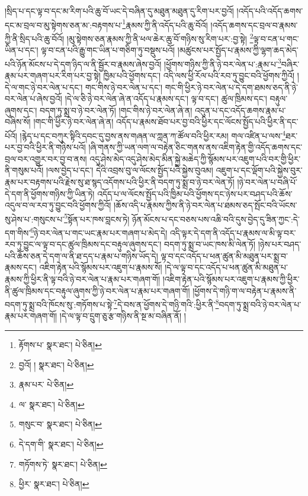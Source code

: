 །སྲིད་པ་དང་ལྟ་བ་དང་མ་རིག་པའི་ཆུ་བོ་ཡང་དེ་བཞིན་དུ་མཐུན་མཐུན་དུ་རིག་པར་བྱའོ། །འདོད་པའི་འདོད་ཆགས་དང་མ་བྲལ་བ་མུ་སྟེགས་ཅན་མ་:བརྟགས་པ་\footnote{རྟོགས་པ་  སྣར་ཐང་།  པེ་ཅིན། }རྣམས་ཀྱི་ནི་འདོད་པའི་ཆུ་བོའོ། །འདོད་ཆགས་དང་བྲལ་བ་རྣམས་ཀྱི་ནི་སྲིད་པའི་ཆུ་བོའོ། །མུ་སྟེགས་ཅན་རྣམས་ཀྱི་ནི་ཕལ་ཆེར་ཆུ་བོ་གཉིས་སུ་རིག་པར་:བྱ་སྟེ། \footnote{བྱའོ། །   སྣར་ཐང་།  པེ་ཅིན། }ལྟ་བ་ངན་པ་གང་ཡིན་པ་དང་། ལྟ་བ་ངན་པའི་རྒྱུ་གང་ཡིན་པ་གཅིག་ཏུ་བསྡུས་པའོ། །མཚུངས་པར་སྤྱོད་པ་རྣམས་ཀྱི་ལྷག་ཆད་མེད་པའི་ཉོན་མོངས་པ་དེ་དག་ཉིད་ལ་ནི་སྦྱོར་བ་རྣམས་ཞེས་བྱའོ། །ཕྱོགས་གཉིས་ཀྱི་ནི་ཉེ་བར་ལེན་པ་:རྣམ་པ་\footnote{རྣམ་པར་  པེ་ཅིན། }བཞིར་རྣམ་པར་གཞག་པར་རིག་པར་བྱ་སྟེ། ཁྱིམ་པའི་ཕྱོགས་དང་། འདི་ལས་ཕྱི་རོལ་པའི་རབ་ཏུ་བྱུང་བའི་ཕྱོགས་ཀྱིའོ། །དེ་ལ་གང་ཉེ་བར་ལེན་པ་དང་། གང་གིས་ཉེ་བར་ལེན་པ་དང་། གང་གི་ཕྱིར་ཉེ་བར་ལེན་པ་དེ་དག་ཐམས་ཅད་ནི་ཉེ་བར་ལེན་པ་ཞེས་བྱའོ། །དེ་ལ་ཅི་ཉེ་བར་ལེན་ཞེ་ན་འདོད་པ་རྣམས་དང་། ལྟ་བ་དང་། ཚུལ་ཁྲིམས་དང་། བརྟུལ་ཞུགས་དང་། བདག་ཏུ་སྨྲ་བ་ཉེ་བར་ལེན་ཏོ། །གང་གིས་ཉེ་བར་ལེན་ཞེ་ན། འདུན་པ་དང་འདོད་ཆགས་རྣམ་པ་བཞིས་སོ། །གང་གི་ཕྱིར་ཉེ་བར་ལེན་ཞེ་ན། འདོད་པ་རྣམས་ཐོབ་པར་བྱ་བའི་ཕྱིར་དང་ལོངས་སྤྱོད་པའི་ཕྱིར་ནི་དང་པོའོ། །རྙེད་པ་དང་བཀུར་སྟིའི་དབང་དུ་བྱས་ནས་གཞན་ལ་ཀླན་ཀ་ཚོལ་བའི་ཕྱིར་རམ། གལ་འཛིན་པ་ལས་\footnote{ལ་  སྣར་ཐང་།  པེ་ཅིན། }ཐར་པར་བྱ་བའི་ཕྱིར་ནི་གཉིས་པའོ། །ཞི་གནས་ཀྱི་ཡན་ལག་ལ་བརྟེན་ཅིང་གནས་ནས་འཇིག་རྟེན་གྱི་འདོད་ཆགས་དང་བྲལ་བར་འགྱུར་བར་བྱ་བ་ནས། འདུ་ཤེས་མེད་འདུ་ཤེས་མེད་མིན་སྐྱེ་མཆེད་ཀྱི་སྙོམས་པར་འཇུག་པའི་བར་གྱི་ཕྱིར་ནི་གསུམ་པའོ། །ལས་བྱེད་པ་དང་། དེའི་འབྲས་བུ་ལ་ལོངས་སྤྱོད་པའི་སྐྱེས་བུའམ། འཇུག་པ་དང་ལྡོག་པའི་སྐྱེས་བུར་རྣམ་པར་བརྟགས་པའི་རྗེས་སུ་ཐ་སྙད་འདོགས་པའི་ཕྱིར་ནི་བདག་ཏུ་སྨྲ་བ་ཉེ་བར་ལེན་ཏོ། །ཉེ་བར་ལེན་པ་བཞི་པོ་དེ་དག་ནི་ཕྱོགས་གཉིས་ཀྱི་ཡིན་ཏེ། འདོད་པ་ལ་ལོངས་སྤྱོད་པའི་ཁྱིམ་པའི་ཕྱོགས་དང་ཉེས་པར་བཤད་པའི་ཆོས་འདུལ་བ་ལ་རབ་ཏུ་བྱུང་བའི་ཕྱོགས་ཀྱིའོ། །ཆོས་འདི་པ་རྣམས་ཀྱིས་ནི་ཉེ་བར་ལེན་པ་ཐམས་ཅད་སྤོང་བའི་ཡོངས་སུ་ཤེས་པ་:གསུངས་པ་\footnote{གསུང་བ་  སྣར་ཐང་།  པེ་ཅིན། }སྟོན་པར་ཁས་བླངས་ཏེ། ཉོན་མོངས་པ་དང་བཅས་པས་འཆི་བའི་དུས་བྱེད་དུ་ཟིན་ཀྱང་:དེ་དག་གིས་\footnote{དེ་དག་གི་  སྣར་ཐང་།  པེ་ཅིན། }ཉེ་བར་ལེན་པ་གང་ཡང་རྣམ་པར་གཞག་པ་མེད་དེ། འདི་ལྟར་དེ་དག་ནི་འདོད་པ་རྣམས་ལ་མི་ལྟ་བར་རབ་ཏུ་བྱུང་ལ་ལྟ་བ་དང་ཚུལ་ཁྲིམས་དང་བརྟུལ་ཞུགས་དང་། བདག་ཏུ་སྨྲ་བ་ཡང་ཁས་མི་ལེན་ཏོ། །ཉེས་པར་བཤད་པའི་ཆོས་ཅན་དེ་དག་ལ་ནི་ཐ་དད་པ་རྣམ་པ་གཉིས་ཡོད་དེ། ལྟ་བ་དང་འདོད་པ་ཕན་ཚུན་མི་མཐུན་པར་སྨྲ་བ་རྣམས་དང་། འཇིག་རྟེན་པའི་སྙོམས་པར་འཇུག་པ་རྣམས་སོ། །དེ་ལ་ལྟ་བ་དང་འདོད་པ་ཕན་ཚུན་མི་མཐུན་པ་རྣམས་ཀྱི་ཕྱིར་ནི་ལྟ་བའི་ཉེ་བར་ལེན་པ་རྣམ་པར་གཞག་གོ། །འཇིག་རྟེན་པའི་སྙོམས་པར་འཇུག་པ་རྣམས་ཀྱི་ཕྱིར་ནི་ཚུལ་ཁྲིམས་དང་བརྟུལ་ཞུགས་ཀྱི་ཉེ་བར་ལེན་པ་རྣམ་པར་གཞག་གོ། །ཕྱོགས་དེ་གཉི་ག་ལ་བརྟེན་པ་རྣམས་ནི་བདག་ཏུ་སྨྲ་བའི་ཁོངས་སུ་:གཏོགས་པ་སྟེ་\footnote{གཏོགས་ཏེ་  སྣར་ཐང་།  པེ་ཅིན། }དེ་བས་ན་ཕྱོགས་དེ་གཉི་གའི་:ཕྱིར་ནི་\footnote{ཕྱིར་  སྣར་ཐང་།  པེ་ཅིན། }བདག་ཏུ་སྨྲ་བའི་ཉེ་བར་ལེན་པ་རྣམ་པར་གཞག་གོ། །དེ་ལ་ལྟ་བ་དྲུག་ཅུ་རྩ་གཉིས་ནི་སྔ་མ་བཞིན་ནོ། །
